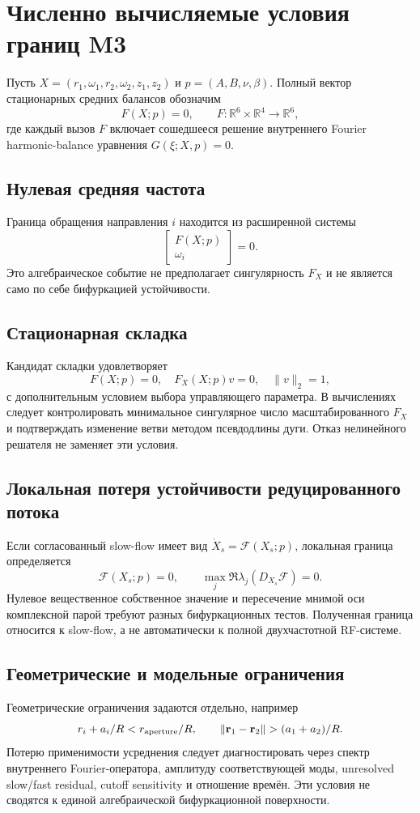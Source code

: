 \section{Численно вычисляемые условия границ M3}

Пусть $X=(r_1,\omega_1,r_2,\omega_2,z_1,z_2)$ и $p=(A,B,\nu,\beta)$.
Полный вектор стационарных средних балансов обозначим
\[
F(X;p)=0,\qquad F:\mathbb{R}^6\times\mathbb{R}^4\to\mathbb{R}^6,
\]
где каждый вызов $F$ включает сошедшееся решение внутреннего Fourier
harmonic-balance уравнения $G(\xi;X,p)=0$.

\subsection{Нулевая средняя частота}

Граница обращения направления $i$ находится из расширенной системы
\[
\begin{bmatrix}F(X;p)\\ \omega_i\end{bmatrix}=0.
\]
Это алгебраическое событие не предполагает сингулярность $F_X$ и не
является само по себе бифуркацией устойчивости.

\subsection{Стационарная складка}

Кандидат складки удовлетворяет
\[
F(X;p)=0,\quad F_X(X;p)v=0,\quad \|v\|_2=1,
\]
с дополнительным условием выбора управляющего параметра. В вычислениях
следует контролировать минимальное сингулярное число масштабированного
$F_X$ и подтверждать изменение ветви методом псевдодлины дуги. Отказ
нелинейного решателя не заменяет эти условия.

\subsection{Локальная потеря устойчивости редуцированного потока}

Если согласованный slow-flow имеет вид $\dot X_s=\mathcal{F}(X_s;p)$,
локальная граница определяется
\[
\mathcal{F}(X_s;p)=0,\qquad
\max_j\Re\lambda_j\!\left(D_{X_s}\mathcal{F}\right)=0.
\]
Нулевое вещественное собственное значение и пересечение мнимой оси
комплексной парой требуют разных бифуркационных тестов. Полученная
граница относится к slow-flow, а не автоматически к полной
двухчастотной RF-системе.

\subsection{Геометрические и модельные ограничения}

Геометрические ограничения задаются отдельно, например
\[
r_i+a_i/R < r_{\rm aperture}/R,\qquad
\|\mathbf r_1-\mathbf r_2\|>(a_1+a_2)/R.
\]
Потерю применимости усреднения следует диагностировать через спектр
внутреннего Fourier-оператора, амплитуду соответствующей моды,
unresolved slow/fast residual, cutoff sensitivity и отношение времён.
Эти условия не сводятся к единой алгебраической бифуркационной поверхности.
